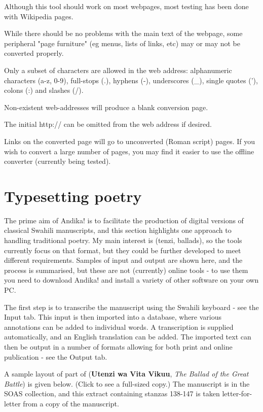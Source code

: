 \documentclass[a4paper,10pt, oneside]{book}
\newcommand\AS[1]{{\citationfont\RLE{#1}}}
\begin{document}
Although this tool should work on most webpages, most testing has been done with Wikipedia pages.

While there should be no problems with the main text of the webpage, some peripheral "page furniture" (eg menus, lists of links, etc) may or may not be converted properly.

Only a subset of characters are allowed in the web address: alphanumeric characters (a-z, 0-9), full-stops (.), hyphens (-), underscores (\_), single quotes ('), colons (:) and slashes (/).

Non-existent web-addresses will produce a blank conversion page.

The initial http:// can be omitted from the web address if desired.

Links on the converted page will go to unconverted (Roman script) pages. If you wish to convert a large number of pages, you may find it easier to use the offline converter (currently being tested).


\chapter{Typesetting poetry}

The prime aim of Andika! is to facilitate the production of digital versions of classical Swahili manuscripts, and this section highlights one approach to handling traditional poetry. My main interest is \AS{تٖينْزِ} (tenzi, ballads), so the tools currently focus on that format, but they could be further developed to meet different requirements. Samples of input and output are shown here, and the process is summarised, but these are not (currently) online tools - to use them you need to download Andika! and install a variety of other software on your own PC.

The first step is to transcribe the manuscript using the Swahili keyboard - see the Input tab. This input is then imported into a database, where various annotations can be added to individual words. A transcription is supplied automatically, and an English translation can be added. The imported text can then be output in a number of formats allowing for both print and online publication - see the Output tab.

A sample layout of part of \AS{أُتٖينْزِ وَ ڤِيتَ ڤِكُؤُ} (\textbf{Utenzi wa Vita Vikuu}, \textit{The Ballad of the Great Battle}) is given below. (Click to see a full-sized copy.) The manuscript is in the SOAS collection, and this extract containing stanzas 138-147 is taken letter-for-letter from a copy of the manuscript.
\end{document}
